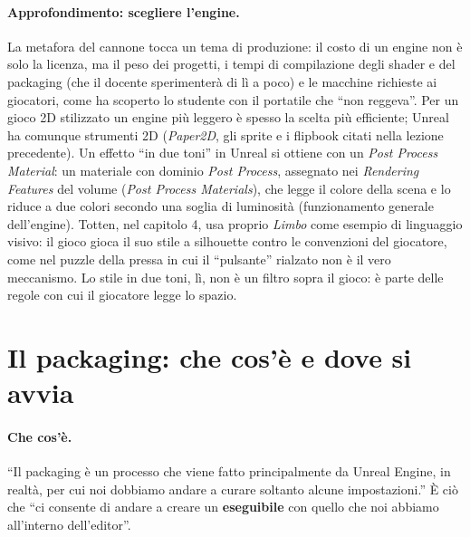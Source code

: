 \paragraph{Approfondimento: scegliere l'engine.} La metafora del cannone tocca un tema di
produzione: il costo di un engine non è solo la licenza, ma il peso dei progetti, i tempi di
compilazione degli shader e del packaging (che il docente sperimenterà di lì a poco) e le
macchine richieste ai giocatori, come ha scoperto lo studente con il portatile che ``non
reggeva''. Per un gioco 2D stilizzato un engine più leggero è spesso la scelta più efficiente;
Unreal ha comunque strumenti 2D (\emph{Paper2D}, gli sprite e i flipbook citati nella lezione
precedente). Un effetto ``in due toni'' in Unreal si ottiene con un \emph{Post Process
Material}: un materiale con dominio \emph{Post Process}, assegnato nei \emph{Rendering
Features} del volume (\emph{Post Process Materials}), che legge il colore della scena e lo
riduce a due colori secondo una soglia di luminosità (funzionamento generale dell'engine).
Totten, nel capitolo 4, usa proprio \emph{Limbo} come esempio di linguaggio visivo: il gioco
gioca il suo stile a silhouette contro le convenzioni del giocatore, come nel puzzle della
pressa in cui il ``pulsante'' rialzato non è il vero meccanismo. Lo stile in due toni, lì, non
è un filtro sopra il gioco: è parte delle regole con cui il giocatore legge lo spazio.

\section{Il packaging: che cos'è e dove si avvia}
\label{ue16:sec:packaging}

\paragraph{Che cos'è.} ``Il packaging è un processo che viene fatto principalmente da Unreal
Engine, in realtà, per cui noi dobbiamo andare a curare soltanto alcune impostazioni.'' È ciò
che ``ci consente di andare a creare un \textbf{eseguibile} con quello che noi abbiamo
all'interno dell'editor''.

